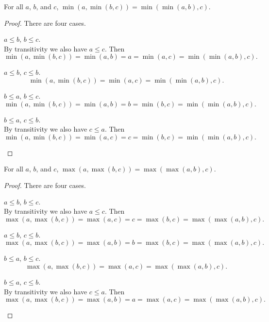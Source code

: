 \documentclass[../../math.tex]{subfiles}
\begin{document}
\begin{theorem}
    For all $a$, $b$, and $c$, $\min(a, \min(b, c)) = \min(\min(a, b), c)$.
\end{theorem}
\begin{proof}
    There are four cases.
    \begin{case} $a \leq b$, $b \leq c$. \\
        By transitivity we also have $a \leq c$.  Then
        \[
            \min(a, \min(b, c)) = \min(a, b) =
            a
            = \min(a, c) = \min(\min(a, b), c).
        \]
    \end{case}
    \begin{case} $a \leq b$, $c \leq b$.
        \[
            \min(a, \min(b, c)) =
            \min(a, c)
            = \min(\min(a, b), c).
        \]
    \end{case}
    \begin{case} $b \leq a$, $b \leq c$.
        \[
            \min(a, \min(b, c)) = \min(a, b) =
            b
            = \min(b, c) = \min(\min(a, b), c).
        \]
    \end{case}
    \begin{case} $b \leq a$, $c \leq b$. \\
        By transitivity we also have $c \leq a$.  Then
        \[
            \min(a, \min(b, c)) = \min(a, c) =
            c
            = \min(b, c) = \min(\min(a, b), c).
        \]
    \end{case}
\end{proof}

\begin{theorem}
    For all $a$, $b$, and $c$, $\max(a, \max(b, c)) = \max(\max(a, b), c)$.
\end{theorem}
\begin{proof}
    There are four cases.
    \begin{case} $a \leq b$, $b \leq c$. \\
        By transitivity we also have $a \leq c$.  Then
        \[
            \max(a, \max(b, c)) = \max(a, c) =
            c
            = \max(b, c) = \max(\max(a, b), c).
        \]
    \end{case}
    \begin{case} $a \leq b$, $c \leq b$.
        \[
            \max(a, \max(b, c)) = \max(a, b) =
            b
            = \max(b, c) = \max(\max(a, b), c).
        \]
    \end{case}
    \begin{case} $b \leq a$, $b \leq c$.
        \[
            \max(a, \max(b, c)) =
            \max(a, c)
            = \max(\max(a, b), c).
        \]
    \end{case}
    \begin{case} $b \leq a$, $c \leq b$. \\
        By transitivity we also have $c \leq a$.  Then
        \[
            \max(a, \max(b, c)) = \max(a, b) =
            a
            = \max(a, c) = \max(\max(a, b), c).
        \]
    \end{case}
\end{proof}
\end{document}
